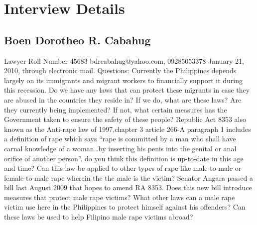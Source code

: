 
\section{Interview Details}
	\subsection{Boen Dorotheo R. Cabahug}	
	\begin{outline}
		\1 Lawyer 
		\1Roll Number 45683
		\1 bdrcabahug@yahoo.com, 09285053378
		\1 January 21, 2010, through electronic mail.
		\1 Questions:
			\2 Currently the Philippines depends largely on its immigrants and migrant workers  to financially support it during this recession. Do we have any laws that can protect these migrants in case they are abused in the countries they reside in?
			\3 If we do, what are these laws? Are they currently being implemented?
			\3 If not, what certain measures has the Government taken to ensure the safety of these people?
			\2 Republic Act 8353 also known as the Anti-rape law of 1997,chapter 3 article 266-A paragraph 1 includes a definition of rape which says ``rape is committed by a man who shall have carnal knowledge of a woman\ldots by inserting his penis into the genital or anal orifice of another person''. do you think this definition is up-to-date in this age and time?
			\3 Can this law be applied to other types of rape like male-to-male or female-to-male rape wherein the the male is the victim?
			\3 Senator Angara passed a bill last August 2009 that hopes to amend RA 8353. Does this new bill introduce measures that protect male rape victims?
			\2 What other laws can a male rape victim use here in the Philippines to protect himself against his offenders?
			\3 Can these laws be used to help Filipino male rape victims abroad?
	\end{outline}
